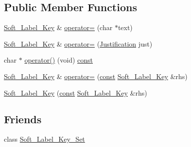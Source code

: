 \subsection*{Public Member Functions}
\begin{DoxyCompactItemize}
\item 
\hyperlink{class_soft___label___key___set_1_1_soft___label___key}{Soft\-\_\-\-Label\-\_\-\-Key} \& \hyperlink{class_soft___label___key___set_1_1_soft___label___key_a9d9f8ab77f5b8f64445459969d4c5f73}{operator=} (char $\ast$text)
\item 
\hyperlink{class_soft___label___key___set_1_1_soft___label___key}{Soft\-\_\-\-Label\-\_\-\-Key} \& \hyperlink{class_soft___label___key___set_1_1_soft___label___key_a0f3f8b0c967ffe830764e830a3b07c3b}{operator=} (\hyperlink{class_soft___label___key___set_1_1_soft___label___key_ad442d6280d079b66e77d86cfa387eb54}{Justification} just)
\item 
char $\ast$ \hyperlink{class_soft___label___key___set_1_1_soft___label___key_a543f42b140abd7ea2e059aab368baaa0}{operator()} (void) \hyperlink{term__entry_8h_a57bd63ce7f9a353488880e3de6692d5a}{const} 
\item 
\hyperlink{class_soft___label___key___set_1_1_soft___label___key}{Soft\-\_\-\-Label\-\_\-\-Key} \& \hyperlink{class_soft___label___key___set_1_1_soft___label___key_ae8c8c48a1d4af5cc93b47a64a2672efb}{operator=} (\hyperlink{term__entry_8h_a57bd63ce7f9a353488880e3de6692d5a}{const} \hyperlink{class_soft___label___key___set_1_1_soft___label___key}{Soft\-\_\-\-Label\-\_\-\-Key} \&rhs)
\item 
\hyperlink{class_soft___label___key___set_1_1_soft___label___key_ac346ec9e2e25dfab084dac4cf23df36c}{Soft\-\_\-\-Label\-\_\-\-Key} (\hyperlink{term__entry_8h_a57bd63ce7f9a353488880e3de6692d5a}{const} \hyperlink{class_soft___label___key___set_1_1_soft___label___key}{Soft\-\_\-\-Label\-\_\-\-Key} \&rhs)
\end{DoxyCompactItemize}
\subsection*{Friends}
\begin{DoxyCompactItemize}
\item 
class \hyperlink{class_soft___label___key___set_1_1_soft___label___key_a8e39446724f3cd921201caaba1941197}{Soft\-\_\-\-Label\-\_\-\-Key\-\_\-\-Set}
\end{DoxyCompactItemize}



